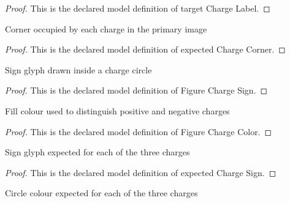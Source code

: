 \begin{proof}
  This is the declared model definition of target Charge Label.
\end{proof}
\begin{definition}
  \label{def:physics:phyx-mini-0898:phyxminiproblems-problemphyxmini0898-expectedchargecorner}
  Corner occupied by each charge in the primary image
\end{definition}
\begin{proof}
  This is the declared model definition of expected Charge Corner.
\end{proof}
\begin{definition}
  \label{def:physics:phyx-mini-0898:phyxminiproblems-problemphyxmini0898-figurechargesign}
  Sign glyph drawn inside a charge circle
\end{definition}
\begin{proof}
  This is the declared model definition of Figure Charge Sign.
\end{proof}
\begin{definition}
  \label{def:physics:phyx-mini-0898:phyxminiproblems-problemphyxmini0898-figurechargecolor}
  Fill colour used to distinguish positive and negative charges
\end{definition}
\begin{proof}
  This is the declared model definition of Figure Charge Color.
\end{proof}
\begin{definition}
  \label{def:physics:phyx-mini-0898:phyxminiproblems-problemphyxmini0898-expectedchargesign}
  Sign glyph expected for each of the three charges
\end{definition}
\begin{proof}
  This is the declared model definition of expected Charge Sign.
\end{proof}
\begin{definition}
  \label{def:physics:phyx-mini-0898:phyxminiproblems-problemphyxmini0898-expectedchargecolor}
  Circle colour expected for each of the three charges
\end{definition}

